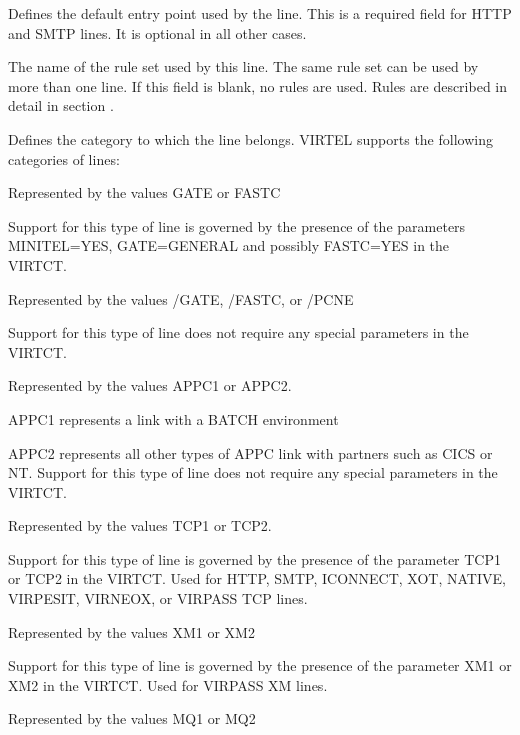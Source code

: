 \documentclass[letterpaper,10pt,english]{sphinxmanual}
\begin{document}
\begin{description}
\sphinxAtStartPar
Defines the default entry point used by the line. This is a required field for HTTP and SMTP lines. It is optional in all other cases.

\sphinxAtStartPar
The name of the rule set used by this line. The same rule set can be used by more than one line. If this field is blank, no rules are used. Rules are described in detail in section .

\sphinxAtStartPar
Defines the category to which the line belongs. VIRTEL supports the following categories of lines:
\begin{description}
\sphinxAtStartPar
Represented by the values GATE or FASTC

\sphinxAtStartPar
Support for this type of line is governed by the presence of the
parameters MINITEL=YES, GATE=GENERAL and possibly FASTC=YES in the
VIRTCT.

\sphinxAtStartPar
Represented by the values /GATE, /FASTC, or /PCNE

\sphinxAtStartPar
Support for this type of line does not require any special
parameters in the VIRTCT.

\sphinxAtStartPar
Represented by the values APPC1 or APPC2.

\sphinxAtStartPar
APPC1 represents a link with a BATCH environment

\sphinxAtStartPar
APPC2 represents all other types of APPC link with partners such as
CICS or NT. Support for this type of line does not require any
special parameters in the VIRTCT.

\sphinxAtStartPar
Represented by the values TCP1 or TCP2.

\sphinxAtStartPar
Support for this type of line is governed by the presence of the
parameter TCP1 or TCP2 in the VIRTCT. Used for HTTP, SMTP, ICONNECT,
XOT, NATIVE, VIRPESIT, VIRNEOX, or VIRPASS TCP lines.

\sphinxAtStartPar
Represented by the values XM1 or XM2

\sphinxAtStartPar
Support for this type of line is governed by the presence of the
parameter XM1 or XM2 in the VIRTCT. Used for VIRPASS XM lines.

\sphinxAtStartPar
Represented by the values MQ1 or MQ2


\end{description}
\end{description}
\end{document}

